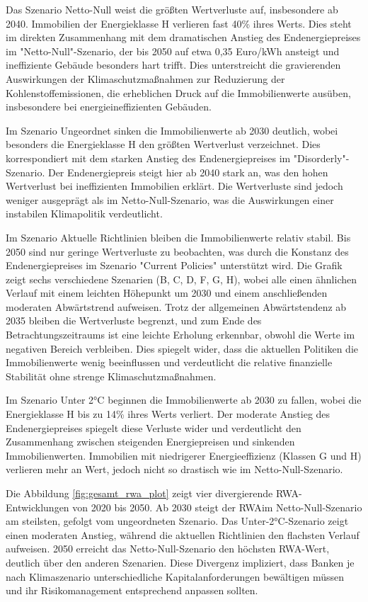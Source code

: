 Das Szenario Netto-Null weist die größten Wertverluste auf, insbesondere ab 2040. Immobilien der Energieklasse H verlieren fast 40\% ihres Werts. Dies steht im direkten Zusammenhang mit dem dramatischen Anstieg des Endenergiepreises im "Netto-Null"-Szenario, der bis 2050 auf etwa 0,35 Euro/kWh ansteigt und ineffiziente Gebäude besonders hart trifft. Dies unterstreicht die gravierenden Auswirkungen der Klimaschutzmaßnahmen zur Reduzierung der Kohlenstoffemissionen, die erheblichen Druck auf die Immobilienwerte ausüben, insbesondere bei energieineffizienten Gebäuden.

Im Szenario Ungeordnet sinken die Immobilienwerte ab 2030 deutlich, wobei besonders die Energieklasse H den größten Wertverlust verzeichnet. Dies korrespondiert mit dem starken Anstieg des Endenergiepreises im "Disorderly"-Szenario. Der Endenergiepreis steigt hier ab 2040 stark an, was den hohen Wertverlust bei ineffizienten Immobilien erklärt. Die Wertverluste sind jedoch weniger ausgeprägt als im Netto-Null-Szenario, was die Auswirkungen einer instabilen Klimapolitik verdeutlicht.

Im Szenario Aktuelle Richtlinien bleiben die Immobilienwerte relativ stabil. Bis 2050 sind nur geringe Wertverluste zu beobachten, was durch die Konstanz des Endenergiepreises im Szenario "Current Policies" unterstützt wird. Die Grafik zeigt sechs verschiedene Szenarien (B, C, D, F, G, H), wobei alle einen ähnlichen Verlauf mit einem leichten Höhepunkt um 2030 und einem anschließenden moderaten Abwärtstrend aufweisen. Trotz der allgemeinen Abwärtstendenz ab 2035 bleiben die Wertverluste begrenzt, und zum Ende des Betrachtungszeitraums ist eine leichte Erholung erkennbar, obwohl die Werte im negativen Bereich verbleiben. Dies spiegelt wider, dass die aktuellen Politiken die Immobilienwerte wenig beeinflussen und verdeutlicht die relative finanzielle Stabilität ohne strenge Klimaschutzmaßnahmen.

Im Szenario Unter 2°C beginnen die Immobilienwerte ab 2030 zu fallen, wobei die Energieklasse H bis zu 14\% ihres Werts verliert. Der moderate Anstieg des Endenergiepreises spiegelt diese Verluste wider und verdeutlicht den Zusammenhang zwischen steigenden Energiepreisen und sinkenden Immobilienwerten. Immobilien mit niedrigerer Energieeffizienz (Klassen G und H) verlieren mehr an Wert, jedoch nicht so drastisch wie im Netto-Null-Szenario.


Die Abbildung \ref{fig:gesamt_rwa_plot} zeigt vier divergierende \acs{RWA}-Entwicklungen von 2020 bis 2050. Ab 2030 steigt der \acs{RWA}im Netto-Null-Szenario am steilsten, gefolgt vom ungeordneten Szenario. Das Unter-2°C-Szenario zeigt einen moderaten Anstieg, während die aktuellen Richtlinien den flachsten Verlauf aufweisen. 2050 erreicht das Netto-Null-Szenario den höchsten RWA-Wert, deutlich über den anderen Szenarien. Diese Divergenz impliziert, dass Banken je nach Klimaszenario unterschiedliche Kapitalanforderungen bewältigen müssen und ihr Risikomanagement entsprechend anpassen sollten.

